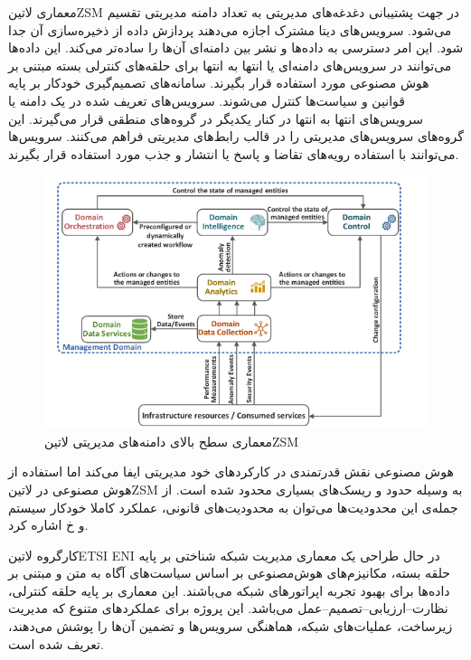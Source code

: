 معماری ‌لاتین{ZSM} در جهت پشتیبانی دغدغه‌های مدیریتی به تعداد دامنه مدیریتی تقسیم می‌شود. سرویس‌های دیتا مشترک اجازه می‌دهند پردازش داده از ذخیره‌سازی آن جدا شود.
این امر دسترسی به داده‌ها و نشر بین دامنه‌ای آن‌ها را ساده‌تر می‌کند. این داده‌ها می‌توانند در سرویس‌های دامنه‌ای یا انتها به انتها برای حلقه‌های کنترلی بسته مبتنی بر هوش مصنوعی مورد استفاده قرار بگیرند.
سامانه‌های تصمیم‌گیری خودکار بر پایه قوانین و سیاست‌ها کنترل می‌شوند.
سرویس‌های تعریف شده در یک دامنه یا سرویس‌های انتها به انتها در کنار یکدیگر در گروه‌های منطقی قرار می‌گیرند. این گروه‌های سرویس‌های مدیریتی را در قالب رابط‌های مدیریتی فراهم می‌کنند.
سرویس‌ها می‌توانند با استفاده رویه‌های تقاضا و پاسخ یا انتشار و جذب مورد استفاده قرار بگیرند.

\begin{figure}
  \centering
  \includegraphics[width=\textwidth]{./fig/zsm-arch.png}
  \caption{معماری سطح بالای دامنه‌های مدیریتی ‌لاتین{ZSM}}
\end{figure}

هوش مصنوعی نقش قدرتمندی در کارکردهای خود مدیریتی ایفا می‌کند اما استفاده از هوش مصنوعی در ‌لاتین{ZSM} به وسیله حدود و ریسک‌های بسیاری محدود شده است.
از جمله‌ی این محدودیت‌ها می‌توان به محدودیت‌های قانونی، عملکرد کاملا خودکار سیستم و ‌خ اشاره کرد.




کارگروه ‌لاتین{ETSI ENI} در حال طراحی یک معماری مدیریت شبکه شناختی
بر پایه حلقه بسته، مکانیزم‌های هوش‌مصنوعی بر اساس سیاست‌های آگاه به متن و مبتنی بر داده‌ها
برای بهبود تجربه اپراتورهای شبکه می‌باشند.
این معماری بر پایه حلقه کنترلی، نظارت--ارزیابی--تصمیم--عمل می‌باشد.
این پروژه برای عملکردهای متنوع که مدیریت زیرساخت، عملیات‌های شبکه،
هماهنگی سرویس‌ها و تضمین آن‌ها را پوشش می‌دهند،‌ تعریف شده است.


